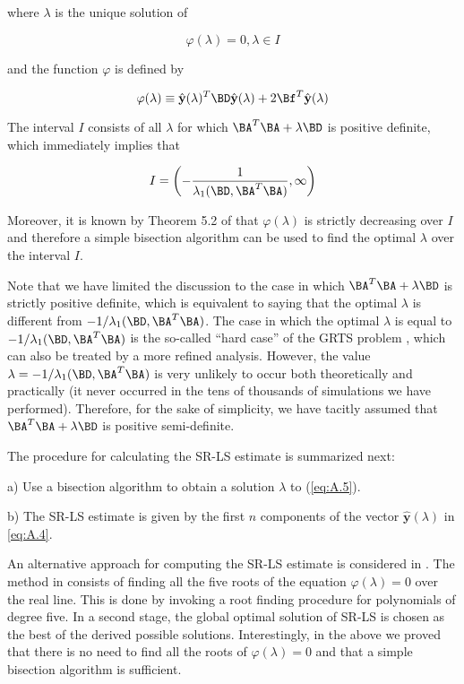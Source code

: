 where $\lambda$ is the unique solution of

\begin{equation} 
\label{eq:A.5}
\varphi(\lambda) = 0, \lambda \in I
\end{equation}

and the function $\varphi$ is defined by

\begin{equation} \label{eq:A.6}
\varphi(\lambda) \equiv \hat{\mathbf{y}}(\lambda)^{T}\BD\hat{\mathbf{y}}(\lambda) + 2\Bf^{T}\hat{\mathbf{y}}(\lambda)
\end{equation}

The interval $I$ consists of all $\lambda$ for which 
$\BA^{T}\BA + \lambda\BD$ is positive definite, which immediately implies
that 

\begin{equation} \label{eq:A.7}
I = \left(-\dfrac{1}{\lambda_1(\BD,\BA^{T}\BA)}, \infty\right)
\end{equation}

Moreover, it is known by Theorem 5.2 of \cite{More} that
$\varphi(\lambda)$ is strictly decreasing over $I$ and therefore
a simple bisection algorithm can be used to find the optimal $\lambda$
over the interval $I$.

Note that we have limited the discussion to the case in which 
$\BA^{T}\BA + \lambda\BD$ is strictly positive definite, which is
equivalent to saying that the optimal $\lambda$ is different from
$-1/\lambda_1(\BD, \BA^{T}\BA)$. The case in which the optimal $\lambda$
is equal to $-1/\lambda_1(\BD, \BA^{T}\BA)$ is the so-called
``hard case'' of the GRTS problem \cite{FortinWol}, which can 
also be treated by a more refined analysis. However, the value 
$\lambda = -1/\lambda_1(\BD, \BA^{T}\BA)$ 
is very unlikely to occur both theoretically and practically
(it never occurred in the tens of thousands of simulations we 
have performed). Therefore, for the sake of simplicity, we have
tacitly assumed that $\BA^{T}\BA + \lambda\BD$
is positive semi-definite.

The procedure for calculating the SR-LS estimate is summarized next:

a) Use a bisection algorithm to obtain a solution $\lambda$ to (\ref{eq:A.5}).

b) The SR-LS estimate is given by the first $n$ components of the 
vector $\hat{\mathbf{y}}(\lambda)$ in \ref{eq:A.4}.

An alternative approach for computing the SR-LS estimate is considered
in \cite{CheungChan}. The method in \cite{CheungChan} consists of 
finding all the five roots
of the equation $\varphi(\lambda) = 0$ over the real line. This is done
by invoking a root finding procedure for polynomials of degree five.
In a second stage, the global optimal solution of SR-LS is chosen as
the best of the derived possible solutions. Interestingly, in the
above we proved that there is no need to find all the roots of
$\varphi(\lambda) = 0$ and that a simple bisection algorithm is 
sufficient.


